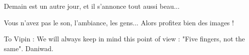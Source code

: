 \begin{multicols}{2}
Demain est un autre jour, et il s'annonce tout aussi beau...

Vous n'avez pas le son, l'ambiance, les gens... Alors profitez bien des images !

To Vipin : We will always keep in mind this point of view : "Five fingers, not the same". Daniwad.

\end{multicols}

